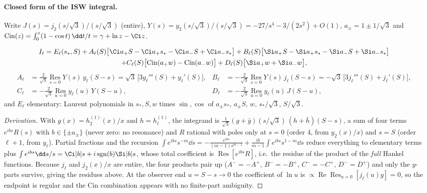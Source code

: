 \paragraph{Closed form of the ISW integral.}  Write $J(s)=j_2(s/\sqrt3)/(s/\sqrt3)$ (entire),
$Y(s)=y_2(s/\sqrt3)/(s/\sqrt3)=-27/s^4-3/(2s^2)+O(1)$, $a_\pm=1\pm1/\sqrt3$ and
$\mathrm{Cin}(z)=\int_0^z(1-\cos t)\,\dd t/t=\gamma+\ln z-\Ci z$.
\begin{theorem}\label{thm:isw}
\begin{multline}
I_\ell=E_\ell(s_*,S)+A_\ell(S)\big[\Ci a_+S-\Ci a_+s_*-\Ci a_-S+\Ci a_-s_*\big]
+B_\ell(S)\big[\Si a_+S-\Si a_+s_*-\Si a_-S+\Si a_-s_*\big]\\
+C_\ell(S)\big[\mathrm{Cin}(a_+w)-\mathrm{Cin}(a_-w)\big]+D_\ell(S)\big[\Si a_+w+\Si a_-w\big],
\end{multline}
\begin{align}
A_\ell&=\tfrac{2}{\sqrt3}\operatorname*{Res}_{s=0}Y(s)\,y_\ell(S-s)=\sqrt3\,\big[3y_\ell'''(S)+y_\ell'(S)\big], &
B_\ell&=-\tfrac{2}{\sqrt3}\operatorname*{Res}_{s=0}Y(s)\,j_\ell(S-s)=-\sqrt3\,\big[3j_\ell'''(S)+j_\ell'(S)\big],\\
C_\ell&=-\tfrac{2}{\sqrt3}\operatorname*{Res}_{u=0}y_\ell(u)\,Y(S-u), &
D_\ell&=-\tfrac{2}{\sqrt3}\operatorname*{Res}_{u=0}y_\ell(u)\,J(S-u),
\end{align}
and $E_\ell$ elementary: Laurent polynomials in $s_*,S,w$ times $\sin,\cos$ of $a_\pm s_*$, $a_\pm S$, $w$, $s_*/\sqrt3$, $S/\sqrt3$.
\end{theorem}
\begin{proof}[Derivation]
With $g(x)=h^{(1)}_2(x)/x$ and $h=h^{(1)}_\ell$, the integrand is $\frac1{\sqrt3}(g+\bar g)(s/\sqrt3)\,(h+\bar h)(S-s)$, a sum of four
terms $e^{ibs}R(s)$ with $b\in\{\pm a_\pm\}$ (never zero: no resonance) and $R$ rational with poles only at $s=0$ (order 4, from
$y_2(x)/x$) and $s=S$ (order $\ell+1$, from $y_\ell$).  Partial fractions and the recursion
$\int e^{ibs}s^{-m}\dd s=-\frac{e^{ibs}}{(m-1)s^{m-1}}+\frac{ib}{m-1}\int e^{ibs}s^{1-m}\dd s$ reduce everything to elementary terms plus
$\int e^{ibs}\dd s/s=\Ci|b|s+i\,\mathrm{sgn}(b)\Si|b|s$, whose total coefficient is $\operatorname{Res}[e^{ibs}R]$, i.e.\ the residue of the
product of the \emph{full} Hankel functions.  Because $j_\ell$ and $j_2(x)/x$ are entire, the four products pair up
($A^-=-A^+$, $B^-=-B^+$, $C^-=-C^+$, $D^-=D^+$) and only the $y$-parts survive, giving the residues above.  At the observer end
$u=S-s\to0$ the coefficient of $\ln u$ is $\propto\operatorname{Re}\operatorname{Res}_{u=0}[j_\ell(u)g]=0$, so the endpoint is regular and
the $\mathrm{Cin}$ combination appears with no finite-part ambiguity.
\end{proof}

